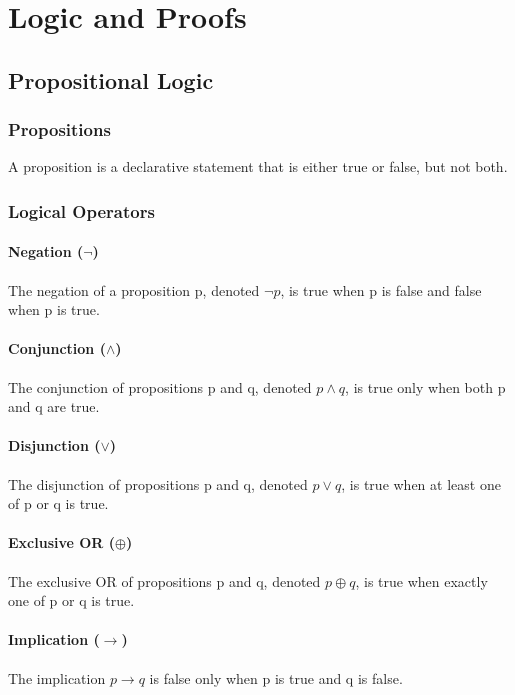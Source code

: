 \documentclass{article}
\begin{document}
\section{Logic and Proofs}

\subsection{Propositional Logic}

\subsubsection{Propositions}
A proposition is a declarative statement that is either true or false, but not both.

\subsubsection{Logical Operators}

\paragraph{Negation ($\neg$)}
The negation of a proposition p, denoted $\neg p$, is true when p is false and false when p is true.

\paragraph{Conjunction ($\land$)}
The conjunction of propositions p and q, denoted $p \land q$, is true only when both p and q are true.

\paragraph{Disjunction ($\lor$)}
The disjunction of propositions p and q, denoted $p \lor q$, is true when at least one of p or q is true.

\paragraph{Exclusive OR ($\oplus$)}
The exclusive OR of propositions p and q, denoted $p \oplus q$, is true when exactly one of p or q is true.

\paragraph{Implication ($\rightarrow$)}
The implication $p \rightarrow q$ is false only when p is true and q is false.
\end{document}
